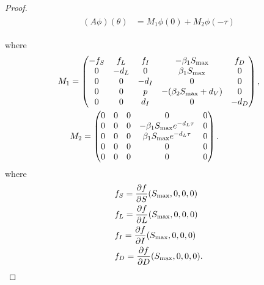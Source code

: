 \documentclass{CMHPhD-SIVD}
\begin{document}
\begin{proof}
\begin{align}\label{26}
\begin{split}
     (A\phi)(\theta)&=M_1 \phi(0)
     +M_2\phi(-\tau)
     \end{split}
\end{align}

where
\begin{eqnarray*}
M_{1}&=
\begin{pmatrix}
       -f_S & f_L & f_I& -\beta_1 S_{\text{max}} & f_D \\
       0 & -d_L & 0 & \beta_1 S_{\text{max}} & 0\\
       0 & 0 & -d_I & 0 & 0 \\
       0 & 0 & p & -(\beta_2 S_{\text{max}}+d_V) & 0 \\
       0 & 0 & d_I & 0 & -d_D
     \end{pmatrix},\nonumber \\
&
M_{2}=
\begin{pmatrix}
     0 & 0 & 0 & 0 & 0 \\
     0 & 0 & 0 & -\beta_1 S_{\text{max}} e^{-d_L \tau} & 0 \\
        0 & 0 & 0 & \beta_1 S_{\text{max}} e^{-d_L \tau} & 0 \\
        0 & 0 & 0 & 0 & 0  \\
        0 & 0 & 0 & 0 & 0
     \end{pmatrix}.
\end{eqnarray*}
where 
\begin{align*}
&f_S=\frac{\partial f}{\partial S}(S_{\text{max}}, 0, 0, 0)\\
&f_L=\frac{\partial f}{\partial L}(S_{\text{max}}, 0, 0, 0)\\
&f_I=\frac{\partial f}{\partial I}(S_{\text{max}}, 0, 0, 0)\\
&f_D=\frac{\partial f}{\partial D}(S_{\text{max}}, 0, 0, 0).
\end{align*}


\end{proof}
\end{document}
